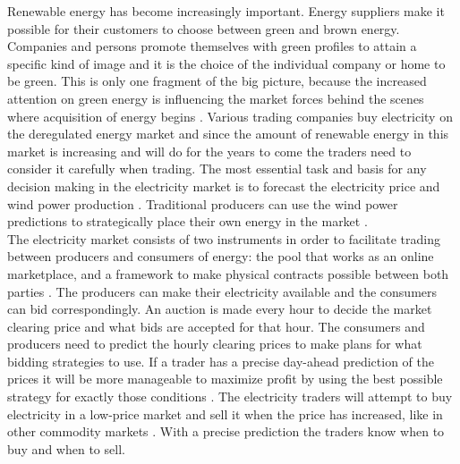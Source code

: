 Renewable energy has become increasingly important. Energy suppliers make it possible for their customers to choose between green and brown energy. Companies and persons promote themselves with green profiles to attain a specific kind of image and it is the choice of the individual company or home to be green. This is only one fragment of the big picture, because the increased attention on green energy is influencing the market forces behind the scenes where acquisition of energy begins \cite{windPowerDanishLiberalized}. Various trading companies buy electricity on the deregulated energy market and since the amount of renewable energy in this market is increasing and will do for the years to come\cite{6, windPowerDanishLiberalized} the traders need to consider it carefully when trading. The most essential task and basis for any decision making in the electricity market is to forecast the electricity price \cite{pjmForecast} and wind power production \cite{dayAheadImpactOfWindPowerForecasts}. Traditional producers can use the wind power predictions to strategically place their own energy in the market \cite{21}.
\\[0.5cm]
The electricity market consists of two instruments in order to facilitate trading between producers and consumers of energy: the pool that works as an online marketplace, and a framework to make physical contracts possible between both parties \cite{21}. The producers can make their electricity available and the consumers can bid correspondingly. An auction is made every hour to decide the market clearing price and what bids are accepted for that hour. The consumers and producers need to predict the hourly clearing prices to make plans for what bidding strategies to use. If a trader has a precise day-ahead prediction of the prices it will be more manageable to maximize profit by using the best possible strategy for exactly those conditions \cite{21}. The electricity traders will attempt to buy electricity in a low-price market and sell it when the price has increased, like in other commodity markets . With a precise prediction the traders know when to buy and when to sell. 


